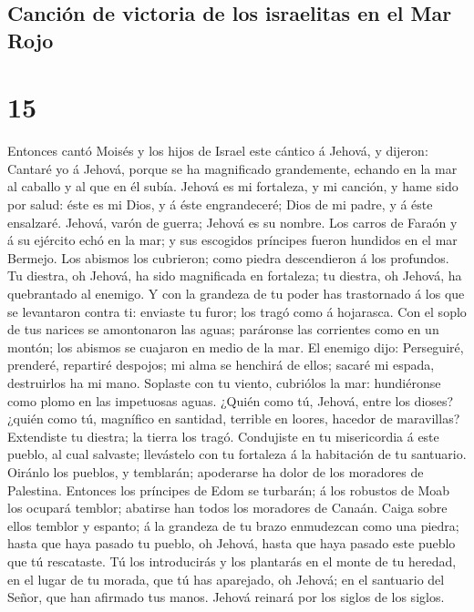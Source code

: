 \hypertarget{canciuxf3n-de-victoria-de-los-israelitas-en-el-mar-rojo}{%
\subsection{Canción de victoria de los israelitas en el Mar
Rojo}\label{canciuxf3n-de-victoria-de-los-israelitas-en-el-mar-rojo}}

\hypertarget{section-14}{%
\section{15}\label{section-14}}

 Entonces cantó Moisés y los hijos de Israel este cántico
á Jehová, y dijeron: Cantaré yo á Jehová, porque se ha magnificado
grandemente, echando en la mar al caballo y al que en él subía.
 Jehová es mi fortaleza, y mi canción, y hame sido por
salud: éste es mi Dios, y á éste engrandeceré; Dios de mi padre, y á
éste ensalzaré.  Jehová, varón de guerra; Jehová es su
nombre.  Los carros de Faraón y á su ejército echó en la
mar; y sus escogidos príncipes fueron hundidos en el mar Bermejo.
 Los abismos los cubrieron; como piedra descendieron á los
profundos.  Tu diestra, oh Jehová, ha sido magnificada en
fortaleza; tu diestra, oh Jehová, ha quebrantado al enemigo.
 Y con la grandeza de tu poder has trastornado á los que
se levantaron contra ti: enviaste tu furor; los tragó como á hojarasca.
 Con el soplo de tus narices se amontonaron las aguas;
paráronse las corrientes como en un montón; los abismos se cuajaron en
medio de la mar.  El enemigo dijo: Perseguiré, prenderé,
repartiré despojos; mi alma se henchirá de ellos; sacaré mi espada,
destruirlos ha mi mano.  Soplaste con tu viento,
cubriólos la mar: hundiéronse como plomo en las impetuosas aguas.
 ¿Quién como tú, Jehová, entre los dioses? ¿quién como
tú, magnífico en santidad, terrible en loores, hacedor de maravillas?
 Extendiste tu diestra; la tierra los tragó.
 Condujiste en tu misericordia á este pueblo, al cual
salvaste; llevástelo con tu fortaleza á la habitación de tu santuario.
 Oiránlo los pueblos, y temblarán; apoderarse ha dolor de
los moradores de Palestina.  Entonces los príncipes de
Edom se turbarán; á los robustos de Moab los ocupará temblor; abatirse
han todos los moradores de Canaán.  Caiga sobre ellos
temblor y espanto; á la grandeza de tu brazo enmudezcan como una piedra;
hasta que haya pasado tu pueblo, oh Jehová, hasta que haya pasado este
pueblo que tú rescataste.  Tú los introducirás y los
plantarás en el monte de tu heredad, en el lugar de tu morada, que tú
has aparejado, oh Jehová; en el santuario del Señor, que han afirmado
tus manos.  Jehová reinará por los siglos de los siglos.

